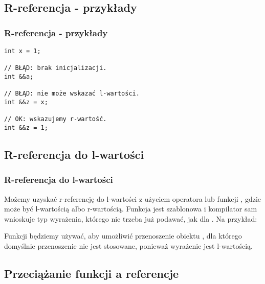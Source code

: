 \documentclass[compress]{beamer}
\begin{document}

\subsection{R-referencja - przykłady}

\begin{frame}[fragile]

  \frametitle{R-referencja - przykłady}

\begin{lstlisting}
int x = 1;

// BŁĄD: brak inicjalizacji.
int &&a;

// BŁĄD: nie może wskazać l-wartości.
int &&z = x;

// OK: wskazujemy r-wartość.
int &&z = 1;
\end{lstlisting}
  
\end{frame}


\subsection{R-referencja do l-wartości}

\begin{frame}[fragile]

  \frametitle{R-referencja do l-wartości}

  Możemy uzyskać r-referencję do l-wartości z użyciem operatora
   lub funkcji ,
  gdzie  może być l-wartością albo r-wartością.  Funkcja
   jest szablonowa i kompilator sam wnioskuje typ
  wyrażenia, którego nie trzeba już podawać, jak dla
  .  Na przykład:

  {\tiny}

  Funkcji  będziemy używać, aby umożliwić
  przenoszenie obiektu , dla którego domyślnie przenoszenie
  nie jest stosowane, ponieważ wyrażenie  jest l-wartością.

\end{frame}


\subsection{Przeciążanie funkcji a referencje}
\end{document}
